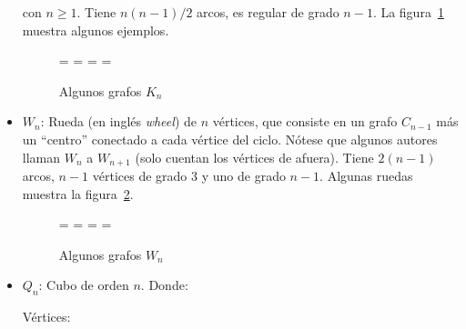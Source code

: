 \begin{itemize}
    con \(n \ge 1\).
    Tiene \(n (n - 1) / 2\) arcos,
    es regular de grado \(n - 1\).
    La figura~\ref{fig:Ks} muestra algunos ejemplos.
    \begin{figure}[htbp]
      =\hbox{}
      =\hbox{}
      =\hbox{}
      =\hbox{}
      \centering
      \subfloat[\(K_3\)]{
	\raisebox{0.5\ht6-0.5\ht3}{\copy3}
      }%
      \hspace{2.5em}%
      \subfloat[\(K_4\)]{
	\raisebox{0.5\ht6-0.5\ht4}{\copy4}
      }%
      \hspace{2.5em}%
      \subfloat[\(K_5\)]{
	\raisebox{0.5\ht6-0.5\ht5}{\copy5}
      }%
      \hspace{2.5em}%
      \caption{Algunos grafos $K_n$}
      \label{fig:Ks}
    \end{figure}
  \item
    \(W_n\): Rueda
    (en inglés \emph{\foreignlanguage{english}{wheel}})
    de \(n\) vértices,
    que consiste en un grafo \(C_{n - 1}\)
    más un ``centro'' conectado a cada vértice del ciclo.
    Nótese que algunos autores llaman \(W_n\) a \(W_{n + 1}\)
    (solo cuentan los vértices de afuera).
    Tiene \(2 (n - 1)\) arcos,
    \(n - 1\) vértices de grado \(3\)
    y uno de grado \(n - 1\).
    Algunas ruedas muestra la figura~\ref{fig:Wn}.
    \begin{figure}[htbp]
      =\hbox{}
      =\hbox{}
      =\hbox{}
      =\hbox{}
      \centering
      \subfloat[\(W_4\)]{
	\raisebox{0.5\ht7-0.5\ht4}{\copy4}
      }%
      \hspace{2.5em}%
      \subfloat[\(W_5\)]{
	\raisebox{0.5\ht7-0.5\ht5}{\copy5}
      }%
      \hspace{2.5em}%
      \subfloat[\(W_6\)]{
	\raisebox{0.5\ht7-0.5\ht6}{\copy6}
      }%
      \hspace{2.5em}%
      \caption{Algunos grafos $W_n$}
      \label{fig:Wn}
    \end{figure}
  \item
    \(Q_n\): Cubo de orden \(n\).
    Donde:
    \begin{center}
      \begin{description}
      \item[Vértices:]

\end{description}
\end{center}
\end{itemize}
